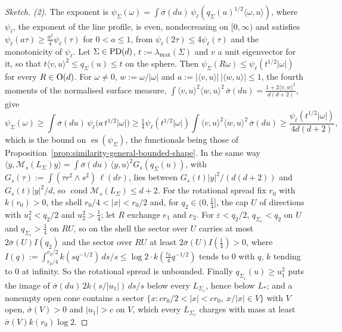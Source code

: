 \begin{proof}[Sketch]
\emph{(2).} The exponent is $\psi_\Sigma(\omega) = \int\overline\sigma(du)\,\psi_\ell(q_\Sigma(u)^{1/2}\langle\omega,u\rangle)$,
where $\psi_\ell$, the exponent of the line profile, is even, nondecreasing on $[0,\infty)$ and satisfies
$\psi_\ell(a\tau) \ge \tfrac{a^2}{4}\psi_\ell(\tau)$ for $0 < a \le 1$, from $\psi_\ell(2\tau) \le
4\psi_\ell(\tau)$ and the monotonicity of $\psi_\ell$. Let $\Sigma \in \mathrm{PD}(d)$, $t := \lambda_{\max}(\Sigma)$ and
$v$ a unit eigenvector for it, so that $t\langle v,u\rangle^2 \le q_\Sigma(u) \le t$ on the sphere. Then
$\psi_\Sigma(R\omega) \le \psi_\ell(t^{1/2}|\omega|)$ for every $R \in \mathrm{O}(d)$. For $\omega \ne 0$, $w := \omega/|\omega|$ and
$a := |\langle v,u\rangle|\,|\langle w,u\rangle| \le 1$, the fourth moments of the normalised surface measure,
$\int\langle v,u\rangle^2\langle w,u\rangle^2\,\overline\sigma(du) = \frac{1 + 2\langle v,w\rangle^2}{d(d+2)}$, give
\[
  \psi_\Sigma(\omega) \ge \int\overline\sigma(du)\,\psi_\ell\bigl(a\,t^{1/2}|\omega|\bigr)
  \ge \tfrac14\psi_\ell(t^{1/2}|\omega|)\int\langle v,u\rangle^2\langle w,u\rangle^2\,\overline\sigma(du)
  \ge \frac{\psi_\ell(t^{1/2}|\omega|)}{4d(d+2)} ,
\]
which is the bound on $\operatorname{es}(\psi_\Sigma)$, the functionals being those of
Proposition~\ref{prop:similarity-general-bounded-shape}. In the same way
$\langle y,\mathcal M_s(L_\Sigma)y\rangle = \int\overline\sigma(du)\,\langle y,u\rangle^2G_s(q_\Sigma(u))$, with
$G_s(\tau) := \int(\tau r^2 \wedge s^2)\,\ell(dr)$, lies between $G_s(t)|y|^2/(d(d+2))$ and $G_s(t)|y|^2/d$, so
$\operatorname{cond}\mathcal M_s(L_\Sigma) \le d+2$. For the rotational spread fix $r_0$ with $k(r_0) > 0$, the shell
$r_0/4 < |x| < r_0/2$ and, for $q_2 \in (0,\tfrac14]$, the cap $U$ of directions with $u_1^2 < q_2/2$ and
$u_2^2 > \tfrac14$; let $R$ exchange $e_1$ and $e_2$. For $\varepsilon < q_2/2$, $q_{\Sigma_\varepsilon} < q_2$ on $U$ and
$q_{\Sigma_\varepsilon} > \tfrac14$ on $RU$, so on the shell the sector over $U$ carries at most $2\overline\sigma(U)I(q_2)$ and
the sector over $RU$ at least $2\overline\sigma(U)I(\tfrac14) > 0$, where
$I(q) := \int_{r_0/4}^{r_0/2}k(sq^{-1/2})\,ds/s \le \log 2\cdot k(\tfrac{r_0}{4}q^{-1/2})$ tends to $0$ with $q$, $k$ tending
to $0$ at infinity. So the rotational spread is unbounded. Finally $q_{\Sigma_\varepsilon}(u) \ge u_1^2$ puts the image of
$\overline\sigma(du)\,2k(s/|u_1|)\,ds/s$ below every $L_{\Sigma_\varepsilon}$, hence below $L_*$; and a nonempty open cone
contains a sector $\{x : cr_0/2 < |x| < cr_0,\ x/|x| \in V\}$ with $V$ open, $\overline\sigma(V) > 0$ and $|u_1| > c$ on
$V$, which every $L_{\Sigma_\varepsilon}$ charges with mass at least $\overline\sigma(V)k(r_0)\log 2$.


\end{proof}
